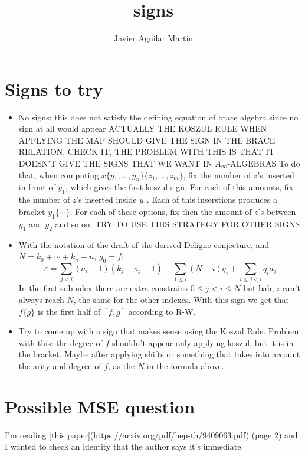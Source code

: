 \documentclass[twoside]{article}
\begin{document}
\title{ signs}
\author{Javier Aguilar Martín}
\maketitle


\section{Signs to try}
\begin{itemize}
\item No signs: this does not satisfy the defining equation of brace algebra since no sign at all would appear ACTUALLY THE KOSZUL RULE WHEN APPLYING THE MAP SHOULD GIVE THE SIGN IN THE BRACE RELATION, CHECK IT, THE PROBLEM WITH THIS IS THAT IT DOESN'T GIVE THE SIGNS THAT WE WANT IN $A_\infty$-ALGEBRAS 
To do that, when computing $x\{y_1,\dots, y_n\}\{z_1,\dots, z_m\}$, fix the number of $z$'s inserted in front of $y_1$, which gives the first koszul sign. For each of this amounts, fix the number of $z$'s inserted inside $y_1$. Each of this inserstions produces a bracket $y_1\{\cdots\}$. For each of these options, fix then the amount of $z$'s between $y_1$ and $y_2$ and so on. TRY TO USE THIS STRATEGY FOR OTHER SIGNS
\item With the notation of the draft of the derived Deligne conjecture, and $N=k_0+\cdots+k_n+n$, $g_0=f$:
\[
\varepsilon=\sum_{j<i}(a_i-1)(k_j+a_j-1)+\sum_{1\leq i}(N-i)q_i+\sum_{i\leq j<i}q_ia_j
\]
In the first subindex there are extra constrains $0\leq j<i\leq N$ but bah, $i$ can't always reach $N$, the same for the other indexes. With this sign we get that $f\{g\}$ is the first half of $[f,g]$ according to R-W.

\item Try to come up with a sign that makes sense using the Koszul Rule. Problem with this: the degree of $f$ shouldn't appear only applying koszul, but it is in the bracket. Maybe after applying shifts or something that takes into account the arity and degree of $f$, as the $N$ in the formula above.
\end{itemize}
\section{Possible MSE question}

I'm reading [this paper](https://arxiv.org/pdf/hep-th/9409063.pdf) (page 2) and I wanted to check an identity that the author says it's immediate. 
\end{document}
